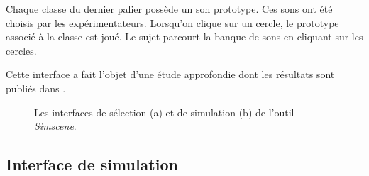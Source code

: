 \documentclass[twoside,twocolumn]{article}
\begin{document}
Chaque classe du dernier palier possède un son prototype. Ces sons ont été choisis par les expérimentateurs. Lorsqu’on clique sur un cercle, le prototype associé à la classe est joué. Le sujet parcourt la banque de sons en cliquant sur les cercles.

Cette interface a fait l'objet d'une étude approfondie dont les résultats sont publiés dans \cite{lafay2016JAES}.

\begin{figure}[t]
        \myfloatalign
         \par
       \caption{Les interfaces de sélection (a) et de simulation (b) de l'outil \emph{Simscene}.}
\end{figure}

\subsection{Interface de simulation}
\end{document}
